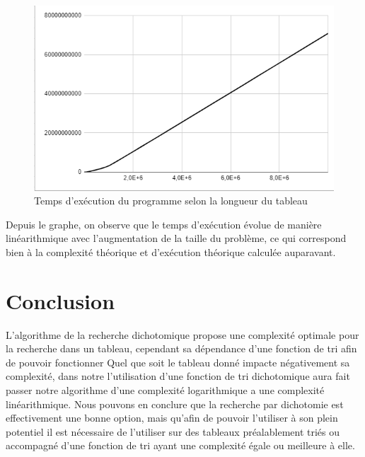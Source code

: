 \begin{figure}[H]
    \centering
        \includegraphics[scale=0.75]{./ressources/tempsexecutiondico.png}
        \caption{Temps d'exécution du programme selon la longueur du tableau}
    \label{fig:temps_exec_dico}
\end{figure}

\par
Depuis le graphe,  on observe que le temps d'exécution évolue de manière linéarithmique avec l'augmentation de la taille du problème, ce qui correspond bien à la complexité théorique et d’exécution théorique calculée auparavant. 

\section{Conclusion}
L'algorithme de la recherche dichotomique propose une complexité optimale pour la recherche dans un tableau, cependant sa dépendance d'une fonction de tri afin de pouvoir fonctionner Quel que soit le tableau donné impacte négativement sa complexité, dans notre l'utilisation d'une fonction de tri dichotomique aura fait passer notre algorithme d'une complexité logarithmique a une complexité linéarithmique. Nous pouvons en conclure que la recherche par dichotomie est effectivement une bonne option, mais qu'afin de pouvoir l'utiliser à son plein potentiel il est nécessaire de l'utiliser sur des tableaux préalablement triés ou accompagné d'une fonction de tri ayant une complexité égale ou meilleure à elle.